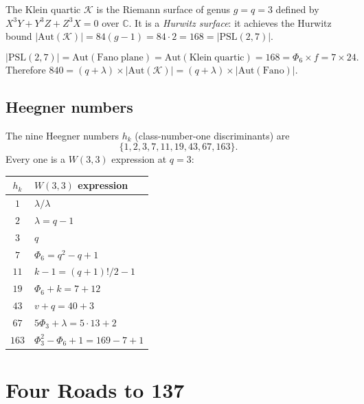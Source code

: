 The Klein quartic $\mathcal{K}$ is the Riemann surface of genus $g=q=3$
defined by $X^3Y+Y^3Z+Z^3X=0$ over $\mathbb{C}$.  It is a
\emph{Hurwitz surface}: it achieves the Hurwitz bound
$|\mathrm{Aut}(\mathcal{K})| = 84(g-1) = 84\cdot 2 = 168 = |\mathrm{PSL}(2,7)|$.

\begin{proposition}
\label{prop:klein}
\begin{equation}
  |\mathrm{PSL}(2,7)|
  = \mathrm{Aut}(\mathrm{Fano\;plane})
  = \mathrm{Aut}(\mathrm{Klein\;quartic})
  = 168
  = \Phi_6 \times f
  = 7 \times 24.
\end{equation}
Therefore $840 = (q+\lambda)\times|\mathrm{Aut}(\mathcal{K})|
= (q+\lambda)\times|\mathrm{Aut}(\mathrm{Fano})|$.
\end{proposition}

\subsection{Heegner numbers}

The nine Heegner numbers $h_k$ (class-number-one discriminants) are
\[
\{1,2,3,7,11,19,43,67,163\}.
\]
Every one is a $W(3,3)$ expression at $q=3$:

\begin{center}
\renewcommand{\arraystretch}{1.25}
\begin{tabular}{cl}
\toprule
$h_k$ & $W(3,3)$ expression \\
\midrule
$1$   & $\lambda/\lambda$ \\
$2$   & $\lambda = q-1$ \\
$3$   & $q$ \\
$7$   & $\Phi_6 = q^2-q+1$ \\
$11$  & $k - 1 = (q+1)!/2 - 1$ \\
$19$  & $\Phi_6 + k = 7 + 12$ \\
$43$  & $v + q = 40 + 3$ \\
$67$  & $5\Phi_3 + \lambda = 5\cdot 13 + 2$ \\
$163$ & $\Phi_3^2 - \Phi_6 + 1 = 169 - 7 + 1$ \\
\bottomrule
\end{tabular}
\end{center}

\section{Four Roads to 137}
\label{sec:part22_alpha}

